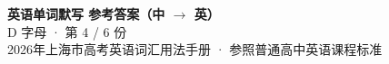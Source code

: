 \documentclass[10pt,a4paper]{article}
\begin{document}
\pagestyle{plain}

\begin{center}
{\LARGE\bfseries 英语单词默写 \quad 参考答案（中 $\to$ 英）}\\[0.22em]
{\large D 字母 · 第 4 / 6 份}\\[0.18em]
{\small 2026年上海市高考英语词汇用法手册 · 参照普通高中英语课程标准}
\end{center}

\vspace{0.2em}
\noindent{\color{rulegray}\rule{\textwidth}{0.8pt}}

\vspace{0.35em}

\vspace{0.25em}
\renewcommand{\arraystretch}{1.32}
\end{document}
